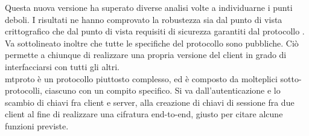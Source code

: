 Questa nuova versione ha superato diverse analisi volte a individuarne i punti deboli.
I risultati ne hanno comprovato la robustezza sia dal punto di vista crittografico \cite{inp:mtproto-attacks}
che dal punto di vista requisiti di sicurezza garantiti dal protocollo \cite{inp:mtproto-proverif}. \\

Va sottolineato inoltre che tutte le specifiche del protocollo sono pubbliche.
Ciò permette a chiunque di realizzare una propria versione del client in grado di interfacciarsi con tutti gli altri. \\

\gls{mtproto} è un protocollo piuttosto complesso, ed è composto da molteplici sotto-protocolli, ciascuno con un compito specifico.
Si va dall'autenticazione e lo scambio di chiavi fra client e server, alla creazione di chiavi di sessione fra due client
al fine di realizzare una cifratura end-to-end, giusto per citare alcune funzioni previste.

